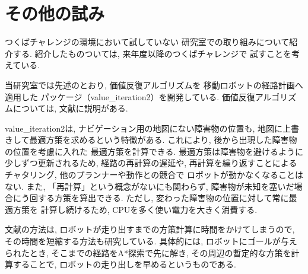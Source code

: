 \documentclass[twocolumn,9pt]{jsproceedings}
\begin{document}
\section{その他の試み}

つくばチャレンジの環境において試していない
研究室での取り組みについて紹介する. 
紹介したものついては, 来年度以降のつくばチャレンジで
試すことを考えている. 

当研究室では先述のとおり, 価値反復アルゴリズムを
移動ロボットの経路計画へ適用した
パッケージ（value\_iteration2\cite{value_iteration2}）を開発している\cite{ueda2023JRM}. 
価値反復アルゴリズムについては, 
文献\cite{上田詳解}に説明がある. 

value\_iteration2は, 
ナビゲーション用の地図にない障害物の位置も, 
地図に上書きして最適方策を求めるという特徴がある. 
これにより, 後から出現した障害物の位置を考慮に入れた
最適方策を計算できる. 
最適方策は障害物を避けるように少しずつ更新されるため, 
経路の再計算の遅延や, 再計算を繰り返すことによるチャタリング, 
他のプランナーや動作との競合で
ロボットが動かなくなることはない. 
また, 「再計算」という概念がないにも関わらず, 
障害物が未知を塞いだ場合にう回する方策を算出できる. 
ただし, 変わった障害物の位置に対して常に最適方策を
計算し続けるため, CPUを多く使い電力を大きく消費する. 

文献\cite{ueda2023JRM}の方法は, 
ロボットが走り出すまでの方策計算に時間をかけてしまうので, 
その時間を短縮する方法も研究している\cite{中村2024}. 
具体的には, ロボットにゴールが与えられたとき, 
そこまでの経路をA*探索で先に解き, 
その周辺の暫定的な方策を計算することで, 
ロボットの走り出しを早めるというものである. 




\end{document}
